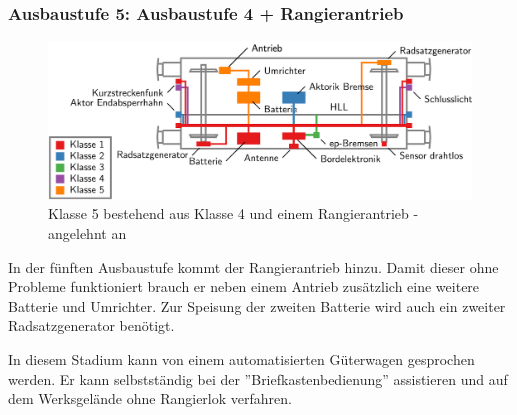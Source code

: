 \subsubsection{Ausbaustufe 5: Ausbaustufe 4 + Rangierantrieb}
\begin{figure}[htbp] 
    \includegraphics[width=\textwidth]{Bilder/Ausbaustufen_5.PNG}
    \caption{Klasse 5 bestehend aus Klasse 4 und einem Rangierantrieb - angelehnt an \cite{ETR_3}}
    \label{fig:Klasse5}
\end{figure} 
In der fünften Ausbaustufe kommt der Rangierantrieb hinzu. Damit dieser ohne Probleme funktioniert brauch er neben einem Antrieb zusätzlich eine weitere Batterie und Umrichter. Zur Speisung der zweiten Batterie wird auch ein zweiter Radsatzgenerator benötigt.\par
In diesem Stadium kann von einem automatisierten Güterwagen gesprochen werden. Er kann selbstständig bei der ''Briefkastenbedienung'' assistieren und auf dem Werksgelände ohne Rangierlok verfahren.
